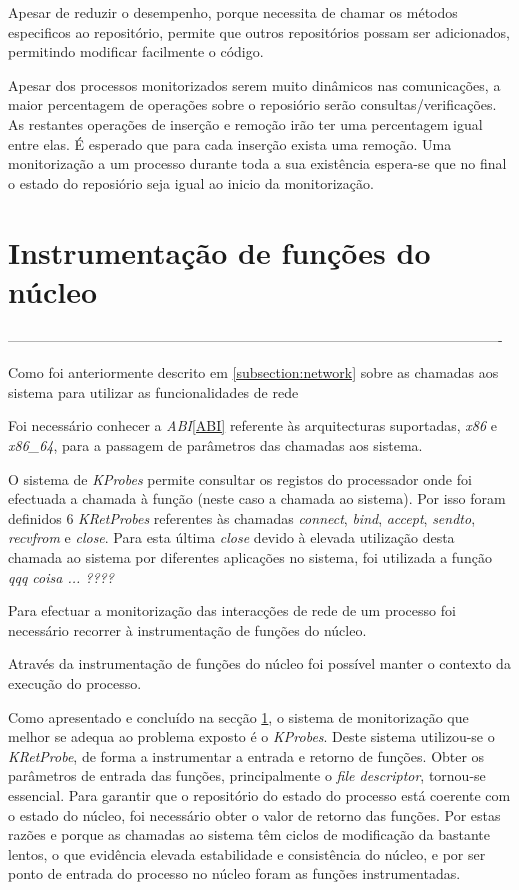 Apesar de reduzir o desempenho, porque necessita de chamar os métodos especificos ao repositório, permite que outros repositórios possam ser adicionados, permitindo modificar facilmente o código.

Apesar dos processos monitorizados serem muito dinâmicos nas comunicações, a maior percentagem de operações sobre o reposiório serão consultas/verificações.
 As restantes operações de inserção e remoção irão ter uma percentagem igual entre elas.
 É esperado que para cada inserção exista uma remoção.
 Uma monitorização a um processo durante toda a sua existência espera-se que no final o estado do reposiório seja igual ao inicio da monitorização.

\section{Instrumentação de funções do núcleo}

----------------------------------------------------------------------------------------------------------

Como foi anteriormente descrito em \ref{subsection:network} sobre as chamadas aos sistema para utilizar as funcionalidades de rede

Foi necessário conhecer a \textit{ABI}\ref{ABI}\cite{ABI} referente às arquitecturas suportadas, \textit{x86} e \textit{x86\_64}, para a passagem de parâmetros das chamadas aos sistema.

O sistema de \textit{KProbes} permite consultar os registos do processador onde foi efectuada a chamada à função (neste caso a chamada ao sistema).
 Por isso foram definidos 6 \textit{KRetProbes} referentes às chamadas \textit{connect}, \textit{bind}, \textit{accept}, \textit{sendto}, \textit{recvfrom} e
\textit{close}.
 Para esta última \textit{close} devido à elevada utilização desta chamada ao sistema por diferentes aplicações no sistema, foi utilizada a função \textit{qqq coisa ...  ????}

Para efectuar a monitorização das interacções de rede de um processo foi necessário recorrer à instrumentação de funções do núcleo.

Através da instrumentação de funções do núcleo foi possível manter o contexto da execução do processo.

Como apresentado e concluído na secção \ref{}, o sistema de monitorização que melhor se adequa ao problema exposto é o \textit{KProbes}.
 Deste sistema utilizou-se o \textit{KRetProbe}, de forma a instrumentar a entrada e retorno de funções.
 Obter os parâmetros de entrada das funções, principalmente o \textit{file descriptor}, tornou-se essencial.
 Para garantir que o repositório do estado do processo está coerente com o estado do núcleo, foi necessário obter o valor de retorno das funções.
 Por estas razões e porque as chamadas ao sistema têm ciclos de modificação da bastante lentos, o que evidência elevada estabilidade e consistência do núcleo, e por ser ponto de entrada do processo no núcleo foram as funções instrumentadas.

